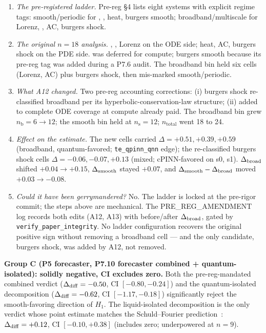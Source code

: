 \begin{enumerate}
  \item \emph{The pre-registered ladder.} Pre-reg \S 4 lists eight
        systems with explicit regime tags: smooth/periodic for \lv{},
        \vdp{}, heat, burgers smooth; broadband/multiscale for Lorenz,
        \fhn{}, AC, burgers shock.
  \item \emph{The original $n=18$ analysis.} \lv{}, \vdp{}, Lorenz on
        the ODE side; heat, AC, burgers shock on the PDE side. \fhn{}
        was deferred for compute; burgers smooth because its pre-reg
        tag was added during a P7.6 audit. The broadband bin held six
        cells (Lorenz, AC) plus burgers shock, then mis-marked
        smooth/periodic.
  \item \emph{What A12 changed.} Two pre-reg accounting corrections:
        (i) burgers shock re-classified broadband per its
        hyperbolic-conservation-law structure; (ii) \fhn{} added to
        complete ODE coverage at compute already paid. The broadband
        bin grew $n_\mathrm{b} = 6 \to 12$; the smooth bin held at
        $n_\mathrm{s} = 12$; $n_\mathrm{total}$ went 18 to 24.
  \item \emph{Effect on the estimate.} The new \fhn{} cells carried
        $\Delta = +0.51, +0.39, +0.59$ (broadband, quantum-favored;
        \texttt{te\_qpinn\_qnn} edge); the re-classified burgers shock
        cells $\Delta = -0.06, -0.07, +0.13$ (mixed; cPINN-favored on
        s0, s1). $\Delta_{\mathrm{broad}}$ shifted $+0.04 \to +0.15$, $\Delta_{\mathrm{smooth}}$
        stayed $+0.07$, and $\Delta_{\mathrm{smooth}} - \Delta_{\mathrm{broad}}$ moved $+0.03 \to
        -0.08$.
  \item \emph{Could it have been gerrymandered?} No. The ladder is
        locked at the pre-rigor commit; the steps above are
        mechanical. The PRE\_REG\_AMENDMENT log records both edits
        (A12, A13) with before/after $\Delta_{\mathrm{broad}}$, gated by
        \texttt{verify\_paper\_integrity}. No ladder configuration
        recovers the original positive sign without removing a
        broadband cell --- and the only candidate, burgers shock, was
        added by A12, not removed.
\end{enumerate}

\textbf{Group C (P5 forecaster, P7.10 forecaster combined +
quantum-isolated): solidly negative, CI excludes zero.} Both the
pre-reg-mandated combined verdict ($\Delta_{\mathrm{diff}} = -0.50$, CI $[-0.80,
-0.24]$) and the quantum-isolated decomposition ($\Delta_{\mathrm{diff}} = -0.62$, CI
$[-1.17, -0.18]$) significantly reject the smooth-favoring direction
of $H_1$. The liquid-isolated decomposition is the only verdict whose
point estimate matches the Schuld--Fourier
prediction~\cite{schuld2021effect}: $\Delta_{\mathrm{diff}} = +0.12$, CI $[-0.10,
+0.38]$ (includes zero; underpowered at $n=9$).


